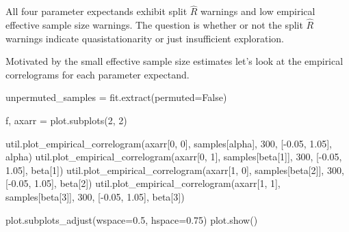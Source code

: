 \documentclass[
  letterpaper,
  DIV=11,
  numbers=noendperiod]{scrartcl}
\newenvironment{Shaded}{\begin{snugshade}}{\end{snugshade}}
\newcommand{\DecValTok}[1]{\textcolor[rgb]{0.68,0.00,0.00}{#1}}
\newcommand{\FloatTok}[1]{\textcolor[rgb]{0.68,0.00,0.00}{#1}}
\newcommand{\NormalTok}[1]{\textcolor[rgb]{0.00,0.23,0.31}{#1}}
\newcommand{\OperatorTok}[1]{\textcolor[rgb]{0.37,0.37,0.37}{#1}}
\newcommand{\StringTok}[1]{\textcolor[rgb]{0.13,0.47,0.30}{#1}}
\newcommand{\VariableTok}[1]{\textcolor[rgb]{0.07,0.07,0.07}{#1}}
\begin{document}
All four parameter expectands exhibit split \(\hat{R}\) warnings and low
empirical effective sample size warnings. The question is whether or not
the split \(\hat{R}\) warnings indicate quasistationarity or just
insufficient exploration.

Motivated by the small effective sample size estimates let's look at the
empirical correlograms for each parameter expectand.

\begin{Shaded}
\begin{Highlighting}[]
\NormalTok{unpermuted\_samples }\OperatorTok{=}\NormalTok{ fit.extract(permuted}\OperatorTok{=}\VariableTok{False}\NormalTok{)}

\NormalTok{f, axarr }\OperatorTok{=}\NormalTok{ plot.subplots(}\DecValTok{2}\NormalTok{, }\DecValTok{2}\NormalTok{)}

\NormalTok{util.plot\_empirical\_correlogram(axarr[}\DecValTok{0}\NormalTok{, }\DecValTok{0}\NormalTok{], samples[}\StringTok{\textquotesingle{}alpha\textquotesingle{}}\NormalTok{], }
                                \DecValTok{300}\NormalTok{, [}\OperatorTok{{-}}\FloatTok{0.05}\NormalTok{, }\FloatTok{1.05}\NormalTok{],  }\StringTok{\textquotesingle{}alpha\textquotesingle{}}\NormalTok{)}
\NormalTok{util.plot\_empirical\_correlogram(axarr[}\DecValTok{0}\NormalTok{, }\DecValTok{1}\NormalTok{], samples[}\StringTok{\textquotesingle{}beta[1]\textquotesingle{}}\NormalTok{], }
                                \DecValTok{300}\NormalTok{, [}\OperatorTok{{-}}\FloatTok{0.05}\NormalTok{, }\FloatTok{1.05}\NormalTok{],  }\StringTok{\textquotesingle{}beta[1]\textquotesingle{}}\NormalTok{)}
\NormalTok{util.plot\_empirical\_correlogram(axarr[}\DecValTok{1}\NormalTok{, }\DecValTok{0}\NormalTok{], samples[}\StringTok{\textquotesingle{}beta[2]\textquotesingle{}}\NormalTok{], }
                                \DecValTok{300}\NormalTok{, [}\OperatorTok{{-}}\FloatTok{0.05}\NormalTok{, }\FloatTok{1.05}\NormalTok{],  }\StringTok{\textquotesingle{}beta[2]\textquotesingle{}}\NormalTok{)}
\NormalTok{util.plot\_empirical\_correlogram(axarr[}\DecValTok{1}\NormalTok{, }\DecValTok{1}\NormalTok{], samples[}\StringTok{\textquotesingle{}beta[3]\textquotesingle{}}\NormalTok{], }
                                \DecValTok{300}\NormalTok{, [}\OperatorTok{{-}}\FloatTok{0.05}\NormalTok{, }\FloatTok{1.05}\NormalTok{],  }\StringTok{\textquotesingle{}beta[3]\textquotesingle{}}\NormalTok{)}

\NormalTok{plot.subplots\_adjust(wspace}\OperatorTok{=}\FloatTok{0.5}\NormalTok{, hspace}\OperatorTok{=}\FloatTok{0.75}\NormalTok{)}
\NormalTok{plot.show()}
\end{Highlighting}
\end{Shaded}
\end{document}
